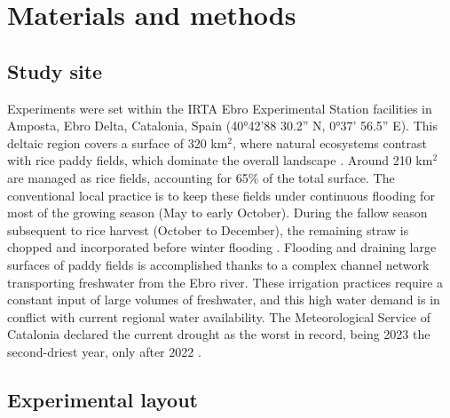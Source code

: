 \section{Materials and methods}
\label{sec:meth2}

\subsection{Study site}
\label{sec:meth_Site2}

Experiments were set within the IRTA Ebro Experimental Station facilities in Amposta, Ebro Delta, Catalonia, Spain (40°42’88 30.2” N, 0°37’ 56.5” E). This deltaic region covers a surface of 320 km$^2$, where natural ecosystems contrast with rice paddy fields, which dominate the overall landscape \citep{romagosa2013sustainability}. Around 210 km$^2$ are managed as rice fields, accounting for 65\% of the total surface. The conventional local practice is to keep these fields under continuous flooding for most of the growing season (May to early October). During the fallow season subsequent to rice harvest (October to December), the remaining straw is chopped and incorporated before winter flooding \citep{martinez-eixarch2021a}. Flooding and draining large surfaces of paddy fields is accomplished thanks to a complex channel network transporting freshwater from the Ebro river. These irrigation practices require a constant input of large volumes of freshwater, and this high water demand is in conflict with current regional water availability. The Meteorological Service of Catalonia declared the current drought as the worst in record, being 2023 the second-driest year, only after 2022 \citep{MeteoCat2024}. 

\subsection{Experimental layout}
\label{sec:meth_Exp2}

